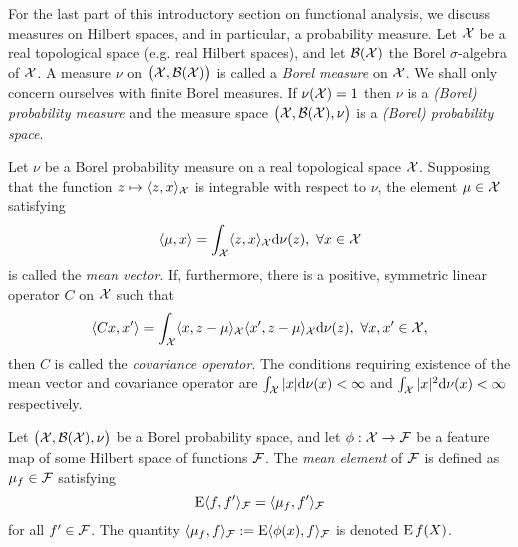 
For the last part of this introductory section on functional analysis, we discuss measures on Hilbert spaces, and in particular, a probability measure.
Let ${\mathcal X}$ be a real topological space (e.g. real Hilbert spaces), and let ${\mathcal B}({\mathcal X})$ the Borel $\sigma$-algebra of ${\mathcal X}$.
A measure $\nu$ on $\big({\mathcal X},{\mathcal B}({\mathcal X})\big)$ is called a \emph{Borel measure} on ${\mathcal X}$.
We shall only concern ourselves with finite Borel measures. 
If $\nu({\mathcal X}) = 1$ then $\nu$ is a \emph{(Borel) probability measure} and the measure space $\big({\mathcal X},{\mathcal B}({\mathcal X}),\nu\big)$ is a \emph{(Borel) probability space}.

\begin{definition}
  Let $\nu$ be a Borel probability measure on a real topological space ${\mathcal X}$.
  Supposing that the function $z \mapsto \langle z,x\rangle_{\mathcal X}$ is integrable with respect to $\nu$, the element $\mu\in{\mathcal X}$ satisfying 
  \[
    \langle\mu,x\rangle = \int_{\mathcal X} \langle z,x\rangle_{\mathcal X} \text{d}\nu(z), \ \forall x \in {\mathcal X}
  \]
  is called the \emph{mean vector}.
  If, furthermore, there is a positive, symmetric linear operator $C$ on ${\mathcal X}$ such that
  \[
    \langle Cx,x'\rangle = \int_{\mathcal X} \langle x,z-\mu\rangle_{\mathcal X}\langle x',z-\mu\rangle_{\mathcal X} \text{d}\nu(z), \ \forall x,x' \in {\mathcal X},
  \]
  then $C$ is called the \emph{covariance operator}.
  The conditions requiring existence of the mean vector and covariance operator are $\int_{\mathcal X} |x| \text{d}\nu(x) < \infty$ and $\int_{\mathcal X} |x|^2 \text{d}\nu(x) < \infty$ respectively.
\end{definition}

\begin{definition}
  Let $\big({\mathcal X},{\mathcal B}({\mathcal X}),\nu\big)$ be a Borel probability space, and let $\phi:{\mathcal X}\to{\mathcal F}$ be a feature map of some Hilbert space of functions ${\mathcal F}$.
  The \emph{mean element} of ${\mathcal F}$ is defined as $\mu_f \in {\mathcal F}$ satisfying
  \[
    \operatorname{E}\langle f,f'\rangle_{\mathcal F} = \langle\mu_f,f'\rangle_{\mathcal F}
  \]
  for all $f'\in{\mathcal F}$.
  The quantity $\langle\mu_f,f\rangle_{\mathcal F} := \operatorname{E}\langle\phi(x),f\rangle_{\mathcal F}$ is denoted $\operatorname{E} f(X)$.
\end{definition}



